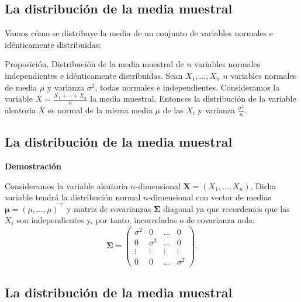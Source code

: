 \documentclass[]{book}
\begin{document}
\hypertarget{la-distribuciuxf3n-de-la-media-muestral}{%
\subsection{La distribución de la media muestral}\label{la-distribuciuxf3n-de-la-media-muestral}}

Vamos cómo se distribuye la media de un conjunto de variables normales e idénticamente distribuidas:

Proposición. Distribución de la media muestral de \(n\) variables normales independientes e idénticamente distribuidas.
Sean \(X_1,\ldots, X_n\) \(n\) variables normales de media \(\mu\) y varianza \(\sigma^2\), todas normales e independientes. Consideramos la variable \(\overline{X}=\frac{X_1+\cdots + X_n}{n}\) la media muestral. Entonces la distribución de la variable aleatoria \(\overline{X}\) es normal de la misma media \(\mu\) de las \(X_i\) y varianza \(\frac{\sigma^2}{n}\).

\hypertarget{la-distribuciuxf3n-de-la-media-muestral-1}{%
\subsection{La distribución de la media muestral}\label{la-distribuciuxf3n-de-la-media-muestral-1}}

\textbf{Demostración}

Consideramos la variable aleatoria \(n\)-dimensional \(\mathbf{X}=(X_1,\ldots,X_n)\). Dicha variable tendrá la distribución normal \(n\)-dimensional con vector de medias \(\mathbf{\mu}=(\mu,\ldots,\mu)^\top\) y matriz de covarianzas \(\mathbf{\Sigma}\) diagonal ya que recordemos que las \(X_i\) son independientes y, por tanto, incorreladas o de covarianza nula:
\[
\mathbf{\Sigma}=\begin{pmatrix}
\sigma^2 & 0 & \ldots & 0 \\
0 & \sigma^2 & \ldots & 0 \\
\vdots & \vdots & \vdots & \vdots \\
0 & 0 & \ldots & \sigma^2
\end{pmatrix}.
\]

\hypertarget{la-distribuciuxf3n-de-la-media-muestral-2}{%
\subsection{La distribución de la media muestral}\label{la-distribuciuxf3n-de-la-media-muestral-2}}
\end{document}

